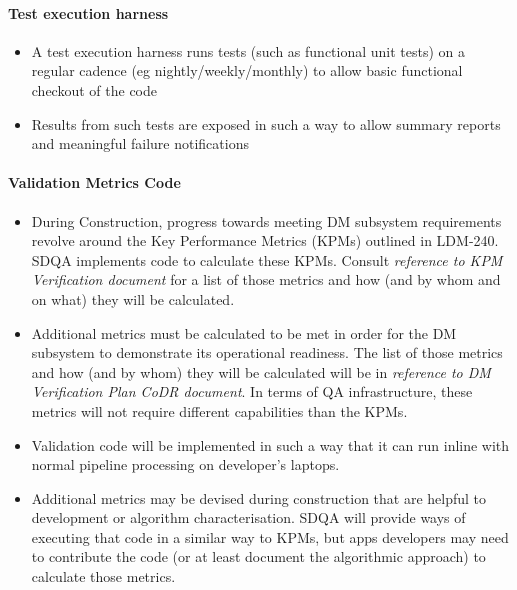 \paragraph{Test execution harness}
\label{sec:qaTestharness}
\begin{itemize}

\item A test execution harness runs tests (such as functional unit
  tests) on a regular cadence (eg nightly/weekly/monthly) to allow
  basic functional checkout of the code

\item Results from such tests are exposed in such a way to allow
  summary reports and meaningful failure notifications

\end{itemize}

\paragraph{Validation Metrics Code}
\label{sec:qaValidate}
\begin{itemize}

\item During Construction, progress towards meeting DM subsystem requirements revolve around the Key Performance Metrics (KPMs) outlined in LDM-240. SDQA implements code to calculate these KPMs. Consult \emph{ reference to KPM Verification document} for a list of those metrics and how (and by whom and on what) they will be calculated. 

\item Additional metrics must be calculated to be met in order for the DM subsystem to demonstrate its operational readiness. The list of those metrics and how (and by whom) they will be calculated will be in \emph{reference to DM Verification Plan CoDR document}. In terms of QA infrastructure, these metrics will not require different capabilities than the KPMs.

\item Validation code will be implemented in such a way that it can run inline with normal pipeline processing on developer's laptops. 

\item Additional metrics may be devised during construction that are helpful to development or algorithm characterisation. SDQA will provide ways of executing that code in a similar way to KPMs, but apps developers may need to contribute the code (or at least document the algorithmic approach) to calculate those metrics.

\end{itemize}

